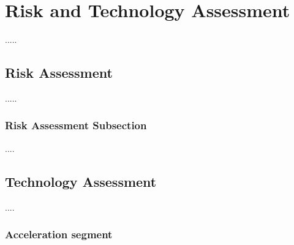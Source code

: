 \chapter{Risk and Technology Assessment}
\label{chap:risks}
.....

 
\section{Risk Assessment}
.....
\subsection{Risk Assessment Subsection}
....

\section{Technology Assessment}
....
\subsection{Acceleration segment}
